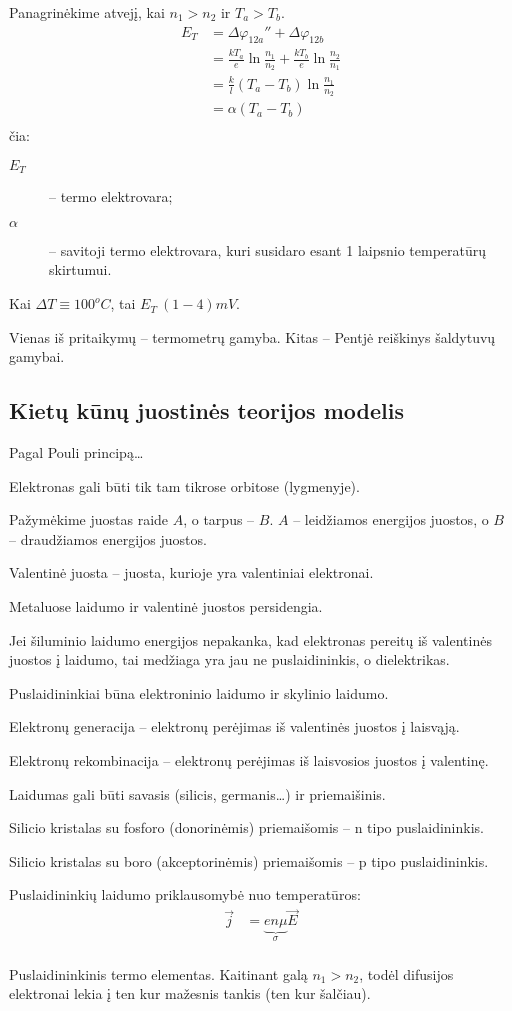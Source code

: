 Panagrinėkime atvejį, kai $n_{1} > n_{2}$ ir $T_{a} > T_{b}$.
\begin{align*}
  E_{T}
  &= \Delta \varphi_{12a}'' + \Delta \varphi_{12b} \\
  &= \frac{kT_{a}}{e}\ln\frac{n_{1}}{n_{2}} +
    \frac{kT_{b}}{e}\ln\frac{n_{2}}{n_{1}} \\
  &= \frac{k}{l} \left( T_{a} - T_{b} \right) \ln \frac{n_{1}}{n_{2}} \\
  &= \alpha (T_{a} - T_{b}) \\
\end{align*}
čia:
\begin{description}
  \item[$E_{T}$] – termo elektrovara;
  \item[$\alpha$] – savitoji termo elektrovara, kuri susidaro esant
    1 laipsnio temperatūrų skirtumui.
\end{description}

Kai $\Delta T \equiv 100^{o}C$, tai $E_{T} ~ (1-4)mV$.

Vienas iš pritaikymų – termometrų gamyba. Kitas – Pentjė reiškinys
šaldytuvų gamybai.

\subsection{Kietų kūnų juostinės teorijos modelis}

Pagal Pouli principą…

Elektronas gali būti tik tam tikrose orbitose (lygmenyje).

Pažymėkime juostas raide $A$, o tarpus – $B$. $A$ – leidžiamos energijos
juostos, o $B$ – draudžiamos energijos juostos.

Valentinė juosta – juosta, kurioje yra valentiniai elektronai.

Metaluose laidumo ir valentinė juostos persidengia.

Jei šiluminio laidumo energijos nepakanka, kad elektronas pereitų
iš valentinės juostos į laidumo, tai medžiaga yra jau ne puslaidininkis,
o dielektrikas.

Puslaidininkiai būna elektroninio laidumo ir skylinio laidumo.

Elektronų generacija – elektronų perėjimas iš valentinės juostos į
laisvąją.

Elektronų rekombinacija – elektronų perėjimas iš laisvosios juostos į
valentinę.

Laidumas gali būti savasis (silicis, germanis…) ir priemaišinis.

Silicio kristalas su fosforo (donorinėmis) priemaišomis – n tipo
puslaidininkis.

Silicio kristalas su boro (akceptorinėmis) priemaišomis – p tipo
puslaidininkis.

Puslaidininkių laidumo priklausomybė nuo temperatūros:
\begin{align*}
  \vec{j} &= \underbrace{e n \mu}_{\sigma} \vec{E} \\
\end{align*}

Puslaidininkinis termo elementas. Kaitinant galą $n_{1} > n_{2}$, todėl
difusijos elektronai lekia į ten kur mažesnis tankis (ten kur šalčiau).
